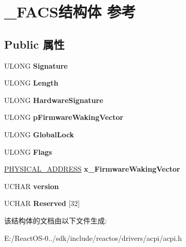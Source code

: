 \hypertarget{struct___f_a_c_s}{}\section{\+\_\+\+F\+A\+C\+S结构体 参考}
\label{struct___f_a_c_s}
\subsection*{Public 属性}
\begin{DoxyCompactItemize}
\item 
\mbox{\label{struct___f_a_c_s_a9ede4b55643079fe43987fed851ffe24}} 
U\+L\+O\+NG {\bfseries Signature}
\item 
\mbox{\label{struct___f_a_c_s_a39b889720f66aaffecb46f49dce3c614}} 
U\+L\+O\+NG {\bfseries Length}
\item 
\mbox{\label{struct___f_a_c_s_ae32411c63852263961127e097ccac973}} 
U\+L\+O\+NG {\bfseries Hardware\+Signature}
\item 
\mbox{\label{struct___f_a_c_s_a575e451feef2889d0cd1e61f3b73758d}} 
U\+L\+O\+NG {\bfseries p\+Firmware\+Waking\+Vector}
\item 
\mbox{\label{struct___f_a_c_s_a720d8a7bc0f2133147c05a7973a2f964}} 
U\+L\+O\+NG {\bfseries Global\+Lock}
\item 
\mbox{\label{struct___f_a_c_s_a83a65d3a38bfe9d06ea2ce7a1d34a74c}} 
U\+L\+O\+NG {\bfseries Flags}
\item 
\mbox{\label{struct___f_a_c_s_a3831e5431c269ca4590ba37c69807734}} 
\hyperlink{union___l_a_r_g_e___i_n_t_e_g_e_r}{P\+H\+Y\+S\+I\+C\+A\+L\+\_\+\+A\+D\+D\+R\+E\+SS} {\bfseries x\+\_\+\+Firmware\+Waking\+Vector}
\item 
\mbox{\label{struct___f_a_c_s_a25a9f559c949a9fd828962edf14a4518}} 
U\+C\+H\+AR {\bfseries version}
\item 
\mbox{\label{struct___f_a_c_s_afda94535337a221562bc5453460cd45b}} 
U\+C\+H\+AR {\bfseries Reserved} \mbox{[}32\mbox{]}
\end{DoxyCompactItemize}


该结构体的文档由以下文件生成\+:\begin{DoxyCompactItemize}
\item 
E\+:/\+React\+O\+S-\/0../sdk/include/reactos/drivers/acpi/acpi.\+h\end{DoxyCompactItemize}
